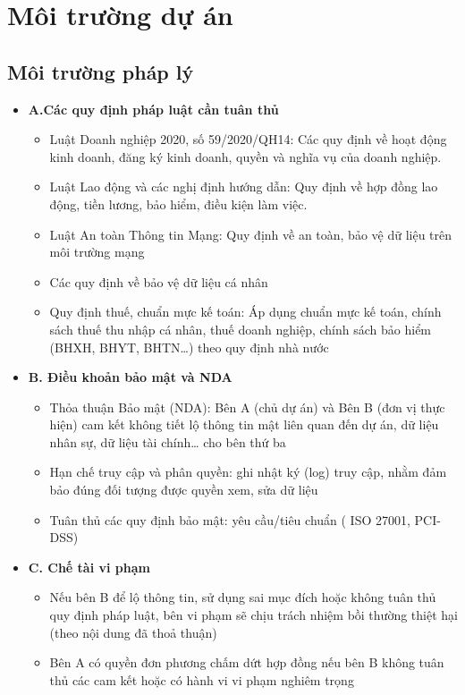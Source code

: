 \section{Môi trường dự án}
\subsection{Môi trường pháp lý}
\begin{itemize}
    \item \textbf{A.Các quy định pháp luật cần tuân thủ}
    \begin{itemize}
        \item Luật Doanh nghiệp 2020, số 59/2020/QH14: Các quy định về hoạt động kinh doanh, đăng ký kinh doanh, quyền và nghĩa vụ của doanh nghiệp.
        \item Luật Lao động và các nghị định hướng dẫn: Quy định về hợp đồng lao động, tiền lương, bảo hiểm, điều kiện làm việc.
        \item Luật An toàn Thông tin Mạng: Quy định về an toàn, bảo vệ dữ liệu trên môi trường mạng
        \item Các quy định về bảo vệ dữ liệu cá nhân
        \item Quy định thuế, chuẩn mực kế toán: Áp dụng chuẩn mực kế toán, chính sách thuế thu nhập cá nhân, thuế doanh nghiệp, chính sách bảo hiểm (BHXH, BHYT, BHTN…) theo quy định nhà nước
    \end{itemize}
    \item \textbf{B. Điều khoản bảo mật và NDA}
    \begin{itemize}
        \item Thỏa thuận Bảo mật (NDA): Bên A (chủ dự án) và Bên B (đơn vị thực hiện) cam kết không tiết lộ thông tin mật liên quan đến dự án, dữ liệu nhân sự, dữ liệu tài chính… cho bên thứ ba
        \item Hạn chế truy cập và phân quyền: ghi nhật ký (log) truy cập, nhằm đảm bảo đúng đối tượng được quyền xem, sửa dữ liệu
        \item Tuân thủ các quy định bảo mật: yêu cầu/tiêu chuẩn ( ISO 27001, PCI-DSS)
    \end{itemize}
    \item \textbf{C. Chế tài vi phạm}
    \begin{itemize}
        \item Nếu bên B để lộ thông tin, sử dụng sai mục đích hoặc không tuân thủ quy định pháp luật, bên vi phạm sẽ chịu trách nhiệm bồi thường thiệt hại (theo nội dung đã thoả thuận)
        \item Bên A có quyền đơn phương chấm dứt hợp đồng nếu bên B không tuân thủ các cam kết hoặc có hành vi vi phạm nghiêm trọng
    \end{itemize}
    \end{itemize}

